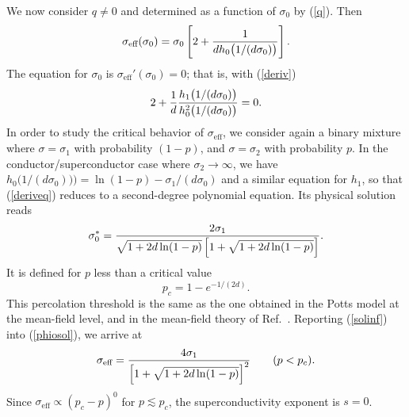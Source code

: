 We now consider $q\neq 0$ and determined as a function of $\sigma_0$
by (\ref{q}). Then
\begin{equation}
\label{phiosol}
\sigma_{\text{eff}}(\sigma_0)=\sigma_0
\left[2+{1\over dh_0 \bigl(1/(d\sigma_0)\bigr)} \right].
\end{equation}
The equation for $\sigma_0$ is $\sigma_{\text{eff}}'(\sigma_0)=0$;
that is, with (\ref{deriv})
\begin{equation}
\label{deriveq}
2+{1\over d}{h_1\bigl(1/(d\sigma_0)\bigr)\over
h_0^2\bigl(1/(d\sigma_0)\bigr)}=0.
\end{equation}
In order to study the critical behavior of $\sigma_{\text{eff}}$,
we consider again a binary mixture where $\sigma=\sigma_1$ with
probability $(1-p)$, and $\sigma=\sigma_2$ with probability
$p$. In the conductor/superconductor case where
$\sigma_2\to\infty$, we have
$h_0\bigl(1/(d\sigma_0))\bigr)=\ln(1-p)-\sigma_1/(d\sigma_0)$ and
a similar equation for $h_1$, so that (\ref{deriveq}) reduces to
a second-degree polynomial equation. Its physical solution reads
\begin{equation}
\label{solinf}
\sigma_0^*={2\sigma_1\over\sqrt{1+2d\ln(1-p)}
\left[1+\sqrt{1+2d\ln(1-p)}\right]}.
\end{equation}
It is defined for $p$ less than a critical value
\begin{equation}
p_c=1-e^{-1/(2d)}.
\end{equation}
This percolation threshold is the same as the one obtained in the Potts
model at the mean-field level, and in the
mean-field theory
of Ref.\ \cite{STEP77}. Reporting (\ref{solinf}) into (\ref{phiosol}),
we arrive at
\begin{equation}
\sigma_{\text{eff}}={4\sigma_1\over
\left[1+\sqrt{1+2d\ln(1-p)}\right]^2}\qquad(p<p_c).\\
\end{equation}
Since $\sigma_{\text{eff}}\propto (p_c-p)^0$
for $p\lesssim p_c$, the superconductivity exponent is $s=0$.

